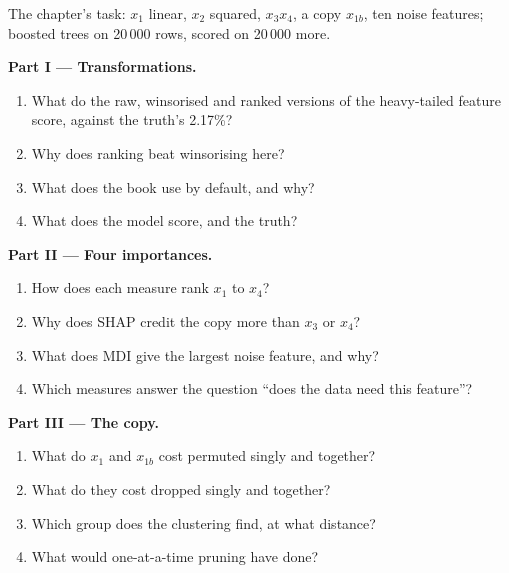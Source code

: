 \begin{problem}\label{pb:ml:feature-engineering-selection-and-importance:1}
The chapter's task: $x_1$ linear, $x_2$ squared, $x_3x_4$, a copy $x_{1b}$, ten noise features; boosted trees on 20\,000
rows, scored on 20\,000 more.

\medskip\noindent\textbf{Part I --- Transformations.}
\begin{enumerate}
\item What do the raw, winsorised and ranked versions of the heavy-tailed feature score, against the truth's 2.17\%?
\item Why does ranking beat winsorising here?
\item What does the book use by default, and why?
\item What does the model score, and the truth?
\end{enumerate}

\medskip\noindent\textbf{Part II --- Four importances.}
\begin{enumerate}[resume]
\item How does each measure rank $x_1$ to $x_4$?
\item Why does SHAP credit the copy more than $x_3$ or $x_4$?
\item What does MDI give the largest noise feature, and why?
\item Which measures answer the question ``does the data need this feature''?
\end{enumerate}

\medskip\noindent\textbf{Part III --- The copy.}
\begin{enumerate}[resume]
\item What do $x_1$ and $x_{1b}$ cost permuted singly and together?
\item What do they cost dropped singly and together?
\item Which group does the clustering find, at what distance?
\item What would one-at-a-time pruning have done?
\end{enumerate}


\end{problem}
